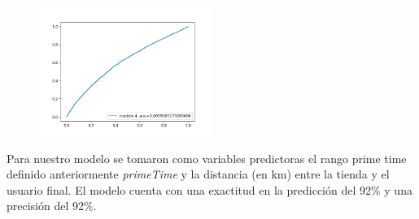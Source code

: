 \documentclass[10pt,a4paper]{article}
\begin{document}
		\begin{figure}[h]
			\centering
			\includegraphics[width=0.5\textwidth]{../Img/curvaRocModelo4}
		\end{figure}
		Para nuestro modelo se tomaron como variables predictoras el rango prime time definido anteriormente \textit{primeTime} y la distancia (en km) entre la tienda y el usuario final. El modelo cuenta con una exactitud en la predicción del 92\% y una precisión del 92\%.
\end{document}
